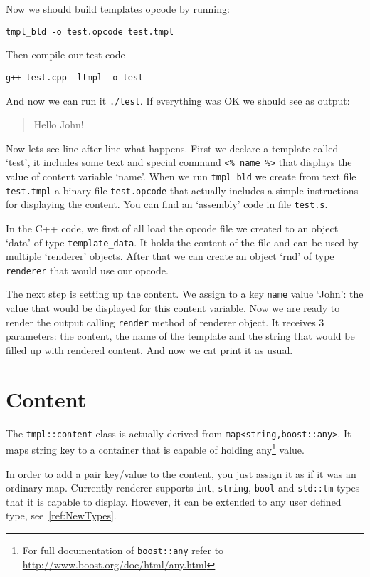\documentclass{article}
\newcommand{\tw}[1]{\texttt{#1}}
\begin{document}
Now we should build templates opcode by running:

\begin{verbatim}
tmpl_bld -o test.opcode test.tmpl
\end{verbatim}

Then compile our test code

\begin{verbatim}
g++ test.cpp -ltmpl -o test
\end{verbatim}

And now we can run it \tw{./test}. If everything was OK we should see as output:

\begin{quote}
Hello John!
\end{quote}

Now lets see line after line what happens. First we declare a template called `test', it includes some
text and special command \verb+<% name %>+ that displays the value of content variable `name'. When we run
\verb+tmpl_bld+ we create from text file \verb+test.tmpl+ a binary file \verb+test.opcode+ that actually 
includes a simple instructions for displaying the content. You can find an `assembly' code in file \verb+test.s+.

In the C++ code, we first of all load the opcode file we created to an object `data' of
type \verb+template_data+. It holds the content of the file and can be used by multiple 
`renderer' objects. After that we can create an object `rnd' of type \verb+renderer+ that would use our opcode.

The next step is setting up the content. We assign to a key \tw{name} value `John': 
the value that would be displayed for this content variable.
Now we are ready to render the output calling \verb+render+ method of renderer object.
It receives 3 parameters: the content, the name of the template and the string that
would be filled up with rendered content. And now we cat print it as usual.

\section{Content}

The \verb+tmpl::content+ class is actually derived from \verb+map<string,boost::any>+. It maps 
string key to a container that is capable of holding any\footnote{For full documentation 
of \tw{boost::any} refer to \url{http://www.boost.org/doc/html/any.html} } value.

In order to add a pair key/value to the content, you just assign it as if it was an ordinary map. 
Currently renderer supports \tw{int}, \tw{string}, \tw{bool} and \tw{std::tm} types that it is capable to display.
However, it can be extended to any user defined type, see~\ref{ref:NewTypes}.
\end{document}
